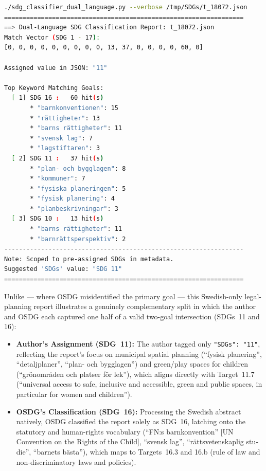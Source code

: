 \begin{casestudySection}
\begin{lstlisting}[language={bash}, basicstyle=\footnotesize, escapechar=|, breaklines=true,
    postbreak=\usebox{\lstbreakbox}, caption={Program's output}, label=lst:t_18072Output]
./sdg_classifier_dual_language.py --verbose /tmp/SDGs/t_18072.json
=================================================================
==> Dual-Language SDG Classification Report: t_18072.json
Match Vector (SDG 1 - 17):
[0, 0, 0, 0, 0, 0, 0, 0, 0, 13, 37, 0, 0, 0, 0, 60, 0]

Assigned value in JSON: "11"

Top Keyword Matching Goals:
  [ 1] SDG 16 :   60 hit(s)
       * "barnkonventionen": 15
       * "rättigheter": 13
       * "barns rättigheter": 11
       * "svensk lag": 7
       * "lagstiftaren": 3
  [ 2] SDG 11 :   37 hit(s)
       * "plan- och bygglagen": 8
       * "kommuner": 7
       * "fysiska planeringen": 5
       * "fysisk planering": 4
       * "planbeskrivningar": 3
  [ 3] SDG 10 :   13 hit(s)
       * "barns rättigheter": 11
       * "barnrättsperspektiv": 2
-----------------------------------------------------------------
Note: Scoped to pre-assigned SDGs in metadata.
Suggested 'SDGs' value: "SDG 11"
=================================================================
\end{lstlisting}

Unlike  --- where OSDG misidentified the primary goal --- this Swedish-only legal-planning report illustrates a genuinely complementary split in which the author and OSDG each captured one half of a valid two-goal intersection (\glspl{SDG}~11 and 16):
\begin{itemize}
    \item \textbf{Author's Assignment (\gls{SDG}~11):} The author tagged only \texttt{"SDGs": "11"}, reflecting the report's focus on municipal spatial planning (\enquote{\foreignlanguage{swedish}{fysisk planering}}, \enquote{\foreignlanguage{swedish}{detaljplaner}}, \enquote{\foreignlanguage{swedish}{plan- och bygglagen}}) and green/play spaces for children (\enquote{\foreignlanguage{swedish}{grönområden och platser för lek}}), which aligns directly with Target~11.7 (\enquote{universal access to safe, inclusive and accessible, green and public spaces, in particular for women and children}).
    
    \item \textbf{OSDG's Classification (\gls{SDG}~16):} Processing the Swedish abstract natively, OSDG classified the report solely as \gls{SDG}~16, latching onto the statutory and human-rights vocabulary (\enquote{\foreignlanguage{swedish}{FN:s barnkonvention}} [UN Convention on the Rights of the Child], \enquote{\foreignlanguage{swedish}{svensk lag}}, \enquote{\foreignlanguage{swedish}{rättsvetenskaplig studie}}, \enquote{\foreignlanguage{swedish}{barnets bästa}}), which maps to Targets~16.3 and 16.b (rule of law and non-discriminatory laws and policies).
    

\end{itemize}
\end{casestudySection}
